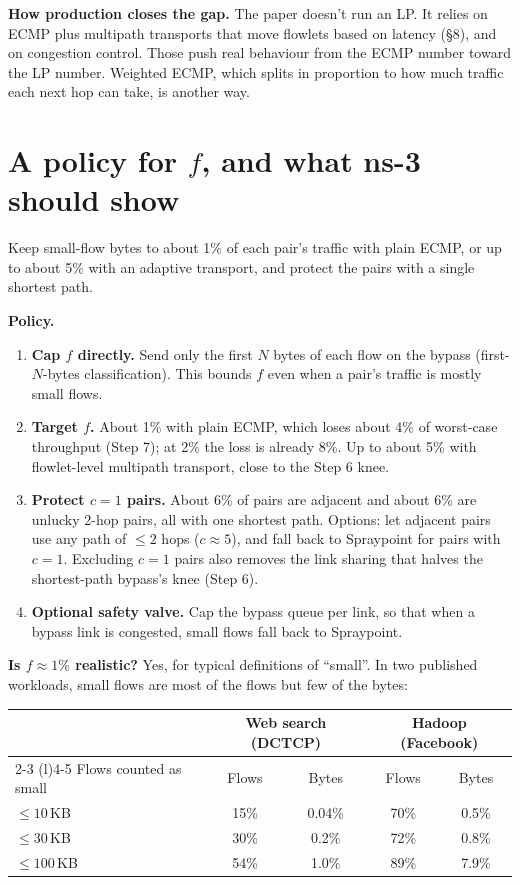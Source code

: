 \documentclass[11pt]{article}
\begin{document}
\textbf{How production closes the gap.} The paper doesn't run an LP. It relies on ECMP plus multipath transports that move flowlets based on latency (§8), and on congestion control. Those push real behaviour from the ECMP number toward the LP number. Weighted ECMP, which splits in proportion to how much traffic each next hop can take, is another way.

\section{A policy for \texorpdfstring{$f$}{f}, and what ns-3 should show}

Keep small-flow bytes to about 1\% of each pair's traffic with plain ECMP, or up to about 5\% with an adaptive transport, and protect the pairs with a single shortest path.

\textbf{Policy.}
\begin{enumerate}
  \item \textbf{Cap $f$ directly.} Send only the first $N$ bytes of each flow on the bypass (first-$N$-bytes classification). This bounds $f$ even when a pair's traffic is mostly small flows.
  \item \textbf{Target $f$.} About 1\% with plain ECMP, which loses about 4\% of worst-case throughput (Step 7); at 2\% the loss is already 8\%. Up to about 5\% with flowlet-level multipath transport, close to the Step 6 knee.
  \item \textbf{Protect $c = 1$ pairs.} About 6\% of pairs are adjacent and about 6\% are unlucky 2-hop pairs, all with one shortest path. Options: let adjacent pairs use any path of $\le 2$ hops ($c \approx 5$), and fall back to Spraypoint for pairs with $c = 1$. Excluding $c = 1$ pairs also removes the link sharing that halves the shortest-path bypass's knee (Step 6).
  \item \textbf{Optional safety valve.} Cap the bypass queue per link, so that when a bypass link is congested, small flows fall back to Spraypoint.
\end{enumerate}

\textbf{Is $f \approx 1\%$ realistic?} Yes, for typical definitions of ``small''. In two published workloads, small flows are most of the flows but few of the bytes:

\begin{center}
\begin{tabular}{@{}lcccc@{}}
\toprule
& \multicolumn{2}{c}{Web search (DCTCP)} & \multicolumn{2}{c}{Hadoop (Facebook)} \\
\cmidrule(lr){2-3} \cmidrule(l){4-5}
Flows counted as small & Flows & Bytes & Flows & Bytes \\
\midrule
$\le 10$\,KB & 15\% & 0.04\% & 70\% & 0.5\% \\
$\le 30$\,KB & 30\% & 0.2\% & 72\% & 0.8\% \\
$\le 100$\,KB & 54\% & 1.0\% & 89\% & 7.9\% \\
\bottomrule
\end{tabular}
\end{center}
\end{document}
